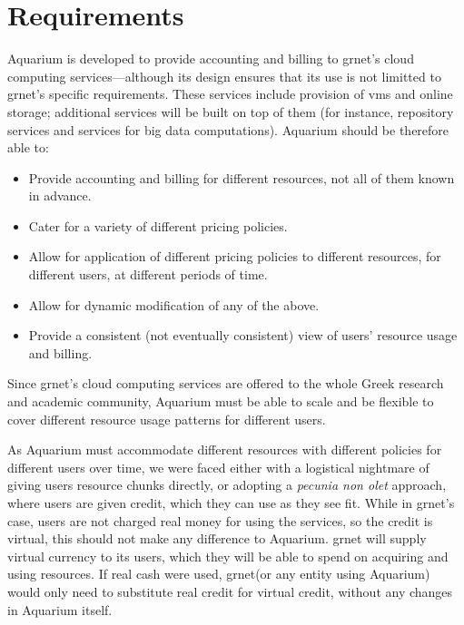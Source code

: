 \documentclass[letterpaper,twocolumn,10pt]{article}
\newcommand{\grnet}{{\sc grnet}\xspace}
\begin{document}
\section{Requirements}

Aquarium is developed to provide accounting and billing to \grnet's
cloud computing services---although its design ensures that its use is
not limitted to \grnet's specific requirements. These services include
provision of {\sc vm}s and online storage; additional services will be
built on top of them (for instance, repository services and services
for big data computations). Aquarium should be therefore able to:

\begin{itemize}

\item Provide accounting and billing for different resources, not all of
them known in advance. 

\item Cater for a variety of different pricing policies.

\item Allow for application of different pricing policies to different
  resources, for different users, at different periods of time.

\item Allow for dynamic modification of any of the above.

\item Provide a consistent (not eventually consistent) view of users'
  resource usage and billing.

\end{itemize}

Since \grnet's cloud computing services are offered to the whole Greek
research and academic community, Aquarium must be able to scale and be
flexible to cover different resource usage patterns for different
users.

As Aquarium must accommodate different resources with different
policies for different users over time, we were faced either with a
logistical nightmare of giving users resource chunks directly, or
adopting a \emph{pecunia non olet} approach, where users are given
credit, which they can use as they see fit. While in \grnet's case, users
are not charged real money for using the services, so the credit is
virtual, this should not make any difference to Aquarium.
\grnet will supply virtual currency to its users, which
they will be able to spend on acquiring and using resources. If real
cash were used, \grnet (or any entity using Aquarium) would only need
to substitute real credit for virtual credit, without any changes in
Aquarium itself.
\end{document}
